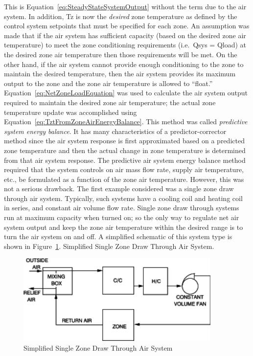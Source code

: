 This is Equation~\ref{eq:SteadyStateSystemOutput} without the term due to the air system. In addition, Tz is now the \emph{desired} zone temperature as defined by the control system setpoints that must be specified for each zone. An assumption was made that if the air system has sufficient capacity (based on the desired zone air temperature) to meet the zone conditioning requirements (i.e.~Qsys = Qload) at the desired zone air temperature then those requirements will be met. On the other hand, if the air system cannot provide enough conditioning to the zone to maintain the desired temperature, then the air system provides its maximum output to the zone and the zone air temperature is allowed to ``float.'' Equation~\ref{eq:NetZoneLoadEquation} was used to calculate the air system output required to maintain the desired zone air temperature; the actual zone temperature update was accomplished using Equation~\ref{eq:TztFromZoneAirEnergyBalance}. This method was called \emph{predictive system energy balance}. It has many characteristics of a predictor-corrector method since the air system response is first approximated based on a predicted zone temperature and then the actual change in zone temperature is determined from that air system response. The predictive air system energy balance method required that the system controls on air mass flow rate, supply air temperature, etc., be formulated as a function of the zone air temperature. However, this was not a serious drawback. The first example considered was a single zone draw through air system. Typically, such systems have a cooling coil and heating coil in series, and constant air volume flow rate. Single zone draw through systems run at maximum capacity when turned on; so the only way to regulate net air system output and keep the zone air temperature within the desired range is to turn the air system on and off. A simplified schematic of this system type is shown in Figure~\ref{fig:simplified-single-zone-draw-through-air}. Simplified Single Zone Draw Through Air System.

\begin{figure}[hbtp] %
\centering
\includegraphics[width=0.9\textwidth, height=0.9\textheight, keepaspectratio=true]{media/image31.svg.png}
\caption{Simplified Single Zone Draw Through Air System \protect \label{fig:simplified-single-zone-draw-through-air}}
\end{figure}

